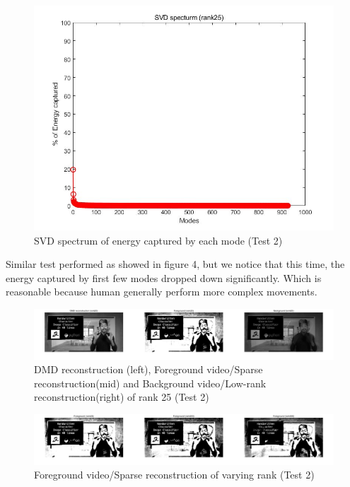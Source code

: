 \documentclass[11pt,a4paper]{article}
\numberwithin{equation}{subsection}
\begin{document}
\begin{figure}[H]
\begin{center}
\includegraphics[scale=0.25]{t2f0.jpg}
\caption{SVD spectrum of energy captured by each mode (Test 2)}
\end{center}
\end{figure}
Similar test performed as showed in figure 4, but we notice that this time, the energy captured by first few modes dropped down significantly. Which is reasonable because human generally perform more complex movements.
\begin{figure}[H]
\begin{center}
\includegraphics[scale=0.17]{t2f1.jpg}
\caption{DMD reconstruction (left), Foreground video/Sparse reconstruction(mid) and Background video/Low-rank reconstruction(right) of rank 25 (Test 2)}
\end{center}
\end{figure}

\begin{figure}[H]
\begin{center}
\includegraphics[scale=0.17]{t2f2.jpg}
\caption{Foreground video/Sparse reconstruction of varying rank (Test 2)}
\end{center}
\end{figure}
\end{document}
